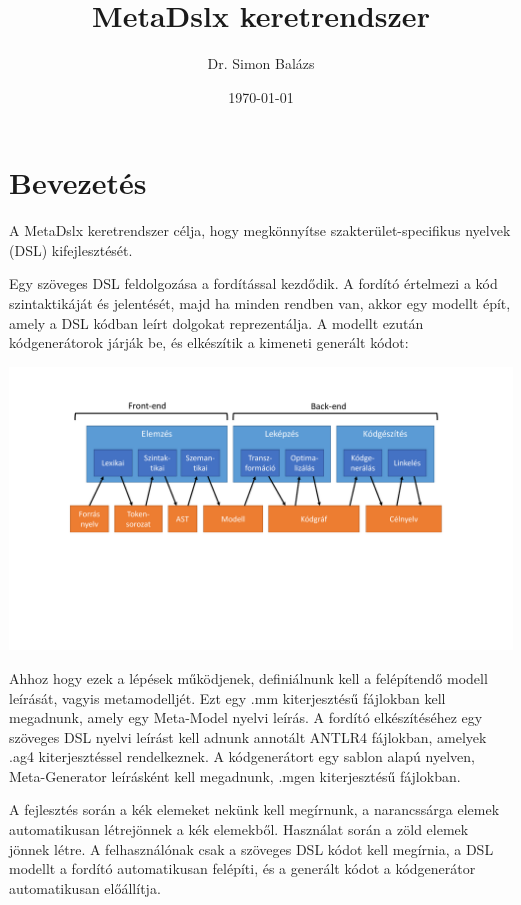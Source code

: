 \documentclass[12pt, a4paper]{report}
\title{MetaDslx keretrendszer}
\author{Dr. Simon Balázs}
\date{\today}
\begin{document}
\maketitle

\tableofcontents

\chapter{Bevezetés}

A MetaDslx keretrendszer célja, hogy megkönnyítse szakterület-specifikus nyelvek (DSL) kifejlesztését.

Egy szöveges DSL feldolgozása a fordítással kezdődik. A fordító értelmezi a kód szintaktikáját és jelentését, majd ha minden rendben van, akkor egy modellt épít, amely a DSL kódban leírt dolgokat reprezentálja. A modellt ezután kódgenerátorok járják be, és elkészítik a kimeneti generált kódot:

\begin{center}\includegraphics[trim=120 20 120 70,clip,width=\textwidth,page=14]{Images.pdf}\end{center}

Ahhoz hogy ezek a lépések működjenek, definiálnunk kell a felépítendő modell leírását, vagyis metamodelljét. Ezt egy .mm kiterjesztésű fájlokban kell megadnunk, amely egy Meta-Model nyelvi leírás. A fordító elkészítéséhez egy szöveges DSL nyelvi leírást kell adnunk annotált ANTLR4 fájlokban, amelyek .ag4 kiterjesztéssel rendelkeznek. A kódgenerátort egy sablon alapú nyelven, Meta-Generator leírásként kell megadnunk, .mgen kiterjesztésű fájlokban.

A fejlesztés során a kék elemeket nekünk kell megírnunk, a narancssárga elemek automatikusan létrejönnek a kék elemekből. Használat során a zöld elemek jönnek létre. A felhasználónak csak a szöveges DSL kódot kell megírnia, a DSL modellt a fordító automatikusan felépíti, és a generált kódot a kódgenerátor automatikusan előállítja.
\end{document}
